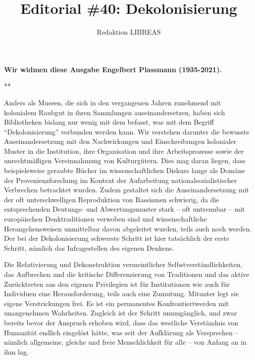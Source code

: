 \documentclass[a4paper,
fontsize=11pt,
oneside,
numbers=noperiodatend,
parskip=half-,
bibliography=totoc,
final
]{scrartcl}
\title{\LARGE{Editorial \#40: Dekolonisierung}}%
\author{Redaktion LIBREAS} %
\date{}
\begin{document}
\maketitle
\thispagestyle{fancyplain} 


{\par \centering \textbf{Wir widmen diese Ausgabe Engelbert Plassmann (1935-2021).}\par}

{\par \centering ***\par}

Anders als Museen, die sich in den vergangenen Jahren zunehmend mit
kolonialem Raubgut in ihren Sammlungen auseinandersetzen, haben sich
Bibliotheken bislang nur wenig mit dem befasst, was mit dem Begriff
\enquote{Dekolonisierung} verbunden werden kann. Wir verstehen darunter
die bewusste Auseinandersetzung mit den Nachwirkungen und
Einschreibungen kolonialer Muster in die Institution, ihre Organisation
und ihre Arbeitsprozesse sowie der unrechtmäßigen Vereinnahmung von
Kulturgütern. Dies mag daran liegen, dass beispielsweise geraubte Bücher
im wissenschaftlichen Diskurs lange als Domäne der Provenienzforschung
im Kontext der Aufarbeitung nationalsozialistischer Verbrechen
betrachtet wurden. Zudem gestaltet sich die Auseinandersetzung mit der
oft unterschwelligen Reproduktion von Rassismen schwierig, da die
entsprechenden Deutungs- und Abwertungsmuster stark -- oft untrennbar --
mit europäischen Denktraditionen verwoben sind und wissenschaftliche
Herangehensweisen unmittelbar davon abgeleitet wurden, teils auch noch
werden. Der bei der Dekolonisierung schwerste Schritt ist hier
tatsächlich der erste Schritt, nämlich das Infragestellen des eigenen
Denkens.

Die Relativierung und Dekonstruktion vermeintlicher
Selbstverständlichkeiten, das Aufbrechen und die kritische
Differenzierung von Traditionen und das aktive Zurücktreten aus den
eigenen Privilegien ist für Institutionen wie auch für Individuen eine
Herausforderung, teils auch eine Zumutung. Mitunter legt sie eigene
Verstrickungen frei. Es ist ein permanentes Konfrontiertwerden mit
unangenehmen Wahrheiten. Zugleich ist der Schritt unumgänglich, und zwar
bereits bevor der Anspruch erhoben wird, dass das westliche Verständnis
von Humanität endlich eingelöst hätte, was seit der Aufklärung als
Versprechen -- nämlich allgemeine, gleiche und freie Menschlichkeit für
alle -- von Anfang an in ihm lag.
\end{document}
